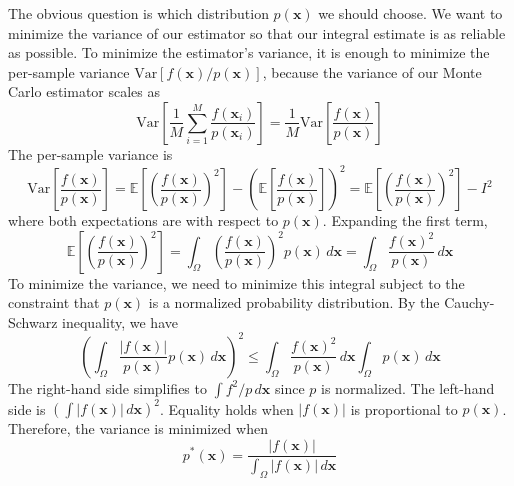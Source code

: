 The obvious question is which distribution $p(\mathbf{x})$ we should choose. We want to minimize the variance of our estimator so that our integral estimate is as reliable as possible. To minimize the estimator's variance, it is enough to minimize the per-sample variance $\text{Var}\left[f(\mathbf{x})/p(\mathbf{x})\right]$, because the variance of our Monte Carlo estimator scales as
\begin{equation}
    \text{Var}\left[\frac{1}{M}\sum_{i=1}^M \frac{f(\mathbf{x}_i)}{p(\mathbf{x}_i)}\right] = \frac{1}{M}\text{Var}\left[\frac{f(\mathbf{x})}{p(\mathbf{x})}\right]
\end{equation}
The per-sample variance is
\begin{equation}
    \text{Var}\left[\frac{f(\mathbf{x})}{p(\mathbf{x})}\right] = \mathbb{E}\left[\left(\frac{f(\mathbf{x})}{p(\mathbf{x})}\right)^2\right] - \left(\mathbb{E}\left[\frac{f(\mathbf{x})}{p(\mathbf{x})}\right]\right)^2 = \mathbb{E}\left[\left(\frac{f(\mathbf{x})}{p(\mathbf{x})}\right)^2\right] - I^2
\end{equation}
where both expectations are with respect to $p(\mathbf{x})$. Expanding the first term,
\begin{equation}
    \mathbb{E}\left[\left(\frac{f(\mathbf{x})}{p(\mathbf{x})}\right)^2\right] = \int_{\Omega} \left(\frac{f(\mathbf{x})}{p(\mathbf{x})}\right)^2 p(\mathbf{x}) \, d\mathbf{x} = \int_{\Omega} \frac{f(\mathbf{x})^2}{p(\mathbf{x})} \, d\mathbf{x}
\end{equation}
To minimize the variance, we need to minimize this integral subject to the constraint that $p(\mathbf{x})$ is a normalized probability distribution. By the Cauchy-Schwarz inequality, we have
\begin{equation}
    \left(\int_{\Omega} \frac{|f(\mathbf{x})|}{p(\mathbf{x})} p(\mathbf{x}) \, d\mathbf{x}\right)^2 \leq \int_{\Omega} \frac{f(\mathbf{x})^2}{p(\mathbf{x})} \, d\mathbf{x} \int_{\Omega} p(\mathbf{x}) \, d\mathbf{x}
\end{equation}
The right-hand side simplifies to $\int f^2/p \, d\mathbf{x}$ since $p$ is normalized. The left-hand side is $\left(\int |f(\mathbf{x})| \, d\mathbf{x}\right)^2$. Equality holds when $|f(\mathbf{x})|$ is proportional to $p(\mathbf{x})$. Therefore, the variance is minimized when
\begin{equation}
p^*(\mathbf{x}) = \frac{|f(\mathbf{x})|}{\int_{\Omega} |f(\mathbf{x})| \, d\mathbf{x}}
\end{equation}
